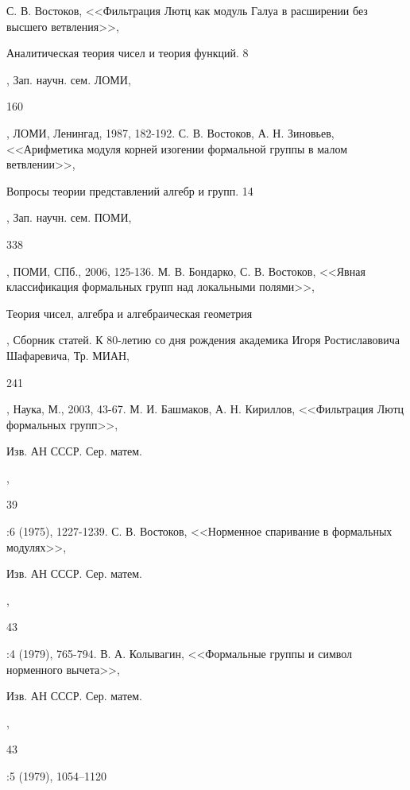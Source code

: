 \documentclass[a4paper]{article}
\begin{document}
\pagebreak 


\begin{thebibliography}{3}   
    С. В. Востоков, <<Фильтрация Лютц как модуль Галуа в расширении без высшего ветвления>>, \begin{it}Аналитическая теория чисел и теория функций. 8\end{it}, Зап. научн. сем. ЛОМИ, \begin{bf}160\end{bf}, ЛОМИ, Ленингад, 1987, 182-192.           
    С. В. Востоков, А. Н. Зиновьев, <<Арифметика модуля корней изогении формальной группы в малом ветвлении>>, \begin{it}Вопросы теории представлений алгебр и групп. 14\end{it}, Зап. научн. сем. ПОМИ, \begin{bf}338\end{bf}, ПОМИ, СПб., 2006, 125-136.           
    М. В. Бондарко, С. В. Востоков, <<Явная классификация формальных групп над локальными полями>>, \begin{it}Теория чисел, алгебра и алгебраическая геометрия\end{it}, Сборник статей. К 80-летию со дня рождения академика Игоря Ростиславовича Шафаревича, Тр. МИАН, \begin{bf}241\end{bf}, Наука, М., 2003, 43-67.
    М. И. Башмаков, А. Н. Кириллов, <<Фильтрация Лютц формальных групп>>, \begin{it}Изв. АН СССР. Сер. матем.\end{it}, \begin{bf}39\end{bf}:6 (1975), 1227-1239.
    С. В. Востоков, <<Норменное спаривание в формальных модулях>>, \begin{it}Изв. АН СССР. Сер. матем.\end{it}, \begin{bf}43\end{bf}:4 (1979), 765-794.
    В. А. Колывагин, <<Формальные группы и символ норменного вычета>>, \begin{it}Изв. АН СССР. Сер. матем.\end{it}, \begin{bf}43\end{bf}:5 (1979), 1054–1120

\end{thebibliography}  
\end{document}
